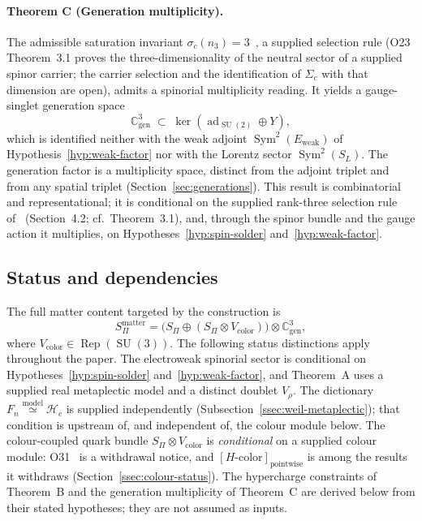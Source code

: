 \documentclass[11pt,a4paper]{article}
\theoremstyle{definition}
\theoremstyle{remark}
\newcommand{\SU}{\operatorname{SU}}
\newcommand{\Rep}{\operatorname{Rep}}
\begin{document}
      \paragraph{Theorem C (Generation multiplicity).}
        The admissible saturation invariant $\sigma_c(n_3) = 3$~\cite{Beau2026a27}, a
        supplied selection rule (O23 Theorem~3.1 proves the three-dimensionality of the
        neutral sector of a supplied spinor carrier; the carrier selection and the
        identification of $\Sigma_c$ with that dimension are open),
        admits a spinorial multiplicity reading.
        It yields a gauge-singlet generation space
      \begin{equation}
        \label{eq:generation-space}
        \mathbb{C}^3_{\mathrm{gen}}
        \;\subset\;
        \ker\!\left(\operatorname{ad}_{\SU(2)} \oplus Y\right),
        \end{equation}
        which is identified neither with the weak adjoint $\operatorname{Sym}^2(E_{\mathrm{weak}})$ of
        Hypothesis~\ref{hyp:weak-factor} nor with the Lorentz sector $\operatorname{Sym}^2(S_L)$.
        The generation factor is a multiplicity space, distinct from the adjoint triplet and from any
        spatial triplet (Section~\ref{sec:generations}).
        This result is combinatorial and representational; it is conditional on the supplied
        rank-three selection rule of~\cite{Beau2026a27} (Section~4.2; cf.\ Theorem~3.1), and, through the
        spinor bundle and the gauge action it multiplies, on Hypotheses~\ref{hyp:spin-solder}
        and~\ref{hyp:weak-factor}.

  \subsection{Status and dependencies}
    \label{ssec:status}

    The full matter content targeted by the construction is
    \begin{equation}
      \label{eq:matter-content}
      S_\Pi^{\mathrm{matter}}
      = \bigl(S_\Pi \oplus (S_\Pi \otimes V_{\mathrm{color}})\bigr)
      \otimes \mathbb{C}^3_{\mathrm{gen}},
    \end{equation}
    where $V_{\mathrm{color}} \in \Rep(\SU(3))$.
    The following status distinctions apply throughout the paper.
    The electroweak spinorial sector is conditional on Hypotheses~\ref{hyp:spin-solder}
    and~\ref{hyp:weak-factor}, and Theorem~A uses a supplied real metaplectic model and a distinct doublet $V_\rho$.
    The dictionary $F_n \overset{\text{model}}{\simeq} \mathcal{H}_c$ is supplied independently
    (Subsection~\ref{ssec:weil-metaplectic}); that condition is upstream of, and independent of,
    the colour module below.
    The colour-coupled quark bundle $S_\Pi \otimes V_{\mathrm{color}}$ is \emph{conditional} on a
    supplied colour module: O31~\cite{Beau2026a35} is a withdrawal notice, and
    $[H\text{-color}]_{\mathrm{pointwise}}$ is among the results it withdraws
    (Section~\ref{ssec:colour-status}).
    The hypercharge constraints of Theorem~B and the generation multiplicity of
    Theorem~C are derived below from their stated hypotheses; they are not assumed as inputs.
\end{document}
